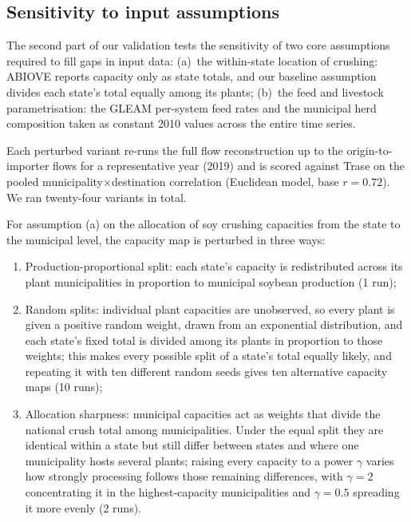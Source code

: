 \documentclass[pdflatex,sn-nature]{sn-jnl}%
\begin{document}
\subsection{Sensitivity to input assumptions}\label{subsec:val-inputs}
The second part of our validation tests the sensitivity of two core assumptions required to fill gaps in input data:
(a)~the within-state location of crushing: ABIOVE reports capacity
only as state totals, and our baseline assumption divides each state's total
equally among its plants; (b)~the feed and livestock parametrisation:
the GLEAM per-system feed rates and the municipal herd
composition taken as constant 2010 values across the entire time series.

Each perturbed variant re-runs the full flow
reconstruction up to the origin-to-importer flows for a representative
year (2019) and is scored against Trase on the pooled
municipality$\times$destination correlation (Euclidean model, base
$r=0.72$). We ran twenty-four variants in total.

For assumption (a) on the allocation of soy crushing capacities from the state to the municipal level, the capacity map is perturbed in three ways:
\begin{enumerate}
\item Production-proportional split: each state's capacity is
redistributed across its plant municipalities in proportion to
municipal soybean production (1 run);
\item Random splits: individual plant capacities are unobserved, so
every plant is given a positive random weight, drawn from an
exponential distribution, and each state's fixed total is divided
among its plants in proportion to those weights; this makes every
possible split of a state's total equally likely, and repeating it
with ten different random seeds gives ten alternative capacity maps
(10 runs);
\item Allocation sharpness: municipal capacities act as weights that
divide the national crush total among municipalities. Under the equal
split they are identical within a state but still differ between
states and where one municipality hosts several plants; raising every
capacity to a power $\gamma$ varies how strongly processing follows
those remaining differences, with $\gamma=2$ concentrating it in the
highest-capacity municipalities and $\gamma=0.5$ spreading it more
evenly (2 runs).
\end{enumerate}
\end{document}
